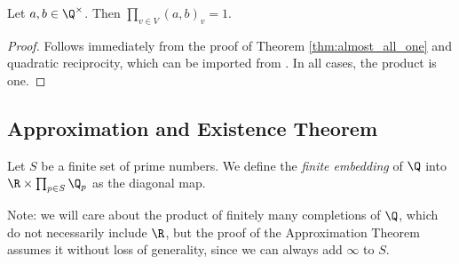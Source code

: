 \begin{theorem}
	\label{thm:product_formula}
	\leanok
Let $a, b \in \Q^\times$. Then $\prod_{v \in V} (a, b)_v = 1$.
\end{theorem}
\begin{proof}
	Follows immediately from the proof of Theorem \ref{thm:almost_all_one} and quadratic reciprocity,
	which can be imported from .
	In all cases, the product is one.
\end{proof}

\subsection{Approximation and Existence Theorem}

\begin{definition}
	\label{def:finite_embedding}
	\leanok
Let $S$ be a finite set of prime numbers.
We define the \emph{finite embedding} of $\Q$ into $\R \times \prod_{p \in S} \Q_p$ as the diagonal map.

\end{definition}

Note: we will care about the product of finitely many completions of $\Q$, which do not necessarily
include $\R$, but the proof of the Approximation Theorem assumes it without loss of generality,
since we can always add $\infty$ to $S$.

